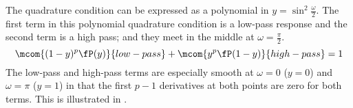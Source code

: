 The  quadrature condition can be expressed as a polynomial
in $y=\sin^2\frac{\omega}{2}$.
The first term in this polynomial quadrature condition is a
low-pass response and the second term is a high pass;
and they meet in the middle at $\omega=\frac{\pi}{2}$.
    \[
      \mcom{(1-y)^p \fP(y)}{low-pass} + \mcom{y^p \fP(1-y)}{high-pass} = 1
    \]
The low-pass and high-pass terms are especially smooth at
$\omega=0$ ($y=0$) and $\omega=\pi$ ($y=1$)
in that the first $p-1$ derivatives at both points are zero
for both terms.
This is illustrated in .

\begin{lemma}
\label{lem:sfact_yz}
\end{lemma}
